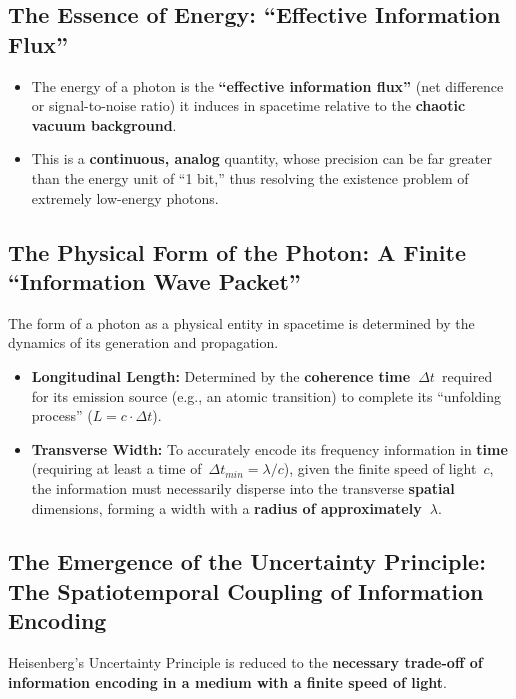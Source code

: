 \documentclass[11pt, a4paper]{article}
\begin{document}
\subsection{The Essence of Energy: ``Effective Information Flux''}

\begin{itemize}
    \item The energy of a photon is the \textbf{``effective information flux''} (net difference or signal-to-noise ratio) it induces in spacetime relative to the \textbf{chaotic vacuum background}.
    \item This is a \textbf{continuous, analog} quantity, whose precision can be far greater than the energy unit of ``1 bit,'' thus resolving the existence problem of extremely low-energy photons.
\end{itemize}

\subsection{The Physical Form of the Photon: A Finite ``Information Wave Packet''}

The form of a photon as a physical entity in spacetime is determined by the dynamics of its generation and propagation.

\begin{itemize}
    \item \textbf{Longitudinal Length:} Determined by the \textbf{coherence time~$\Delta t$}~required for its emission source (e.g., an atomic transition) to complete its ``unfolding process'' ($L = c \cdot \Delta t$).
    \item \textbf{Transverse Width:} To accurately encode its frequency information in \textbf{time} (requiring at least a time of~$\Delta t_{min} = \lambda/c$), given the finite speed of light~$c$, the information must necessarily disperse into the transverse \textbf{spatial} dimensions, forming a width with a \textbf{radius of approximately~$\lambda$}.
\end{itemize}

\subsection{The Emergence of the Uncertainty Principle: The Spatiotemporal Coupling of Information Encoding}

Heisenberg's Uncertainty Principle is reduced to the \textbf{necessary trade-off of information encoding in a medium with a finite speed of light}.
\end{document}
